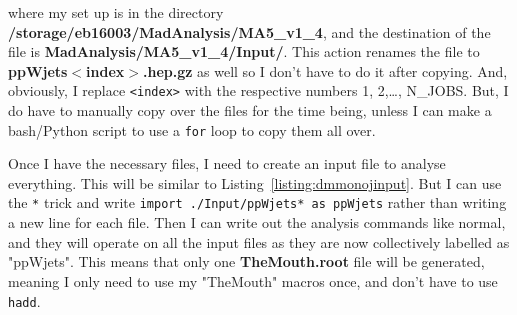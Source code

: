 where my \madanalysis set up is in the directory \textbf{/storage/eb16003/MadAnalysis/MA5\_v1\_4}, and the destination of the file is \textbf{MadAnalysis/MA5\_v1\_4/Input/}. This action renames the file to \textbf{ppWjets$<$index$>$.hep.gz} as well so I don't have to do it after copying. And, obviously, I replace \texttt{<index>} with the respective numbers 1, 2,\ldots, N\_JOBS. But, I do have to manually copy over the files for the time being, unless I can make a bash/Python script to use a \texttt{for} loop to copy them all over.


Once I have the necessary files, I need to create an input file to analyse everything. This will be similar to Listing~\ref{listing:dmmonojinput}. But I can use the \texttt{*} trick and write \texttt{import ./Input/ppWjets* as ppWjets} rather than writing a new line for each file. Then I can write out the analysis commands like normal, and they will operate on all the input files as they are now collectively labelled as "ppWjets". This means that only one \textbf{TheMouth.root} file will be generated, meaning I only need to use my "TheMouth" macros once, and don't have to use \texttt{hadd}.

